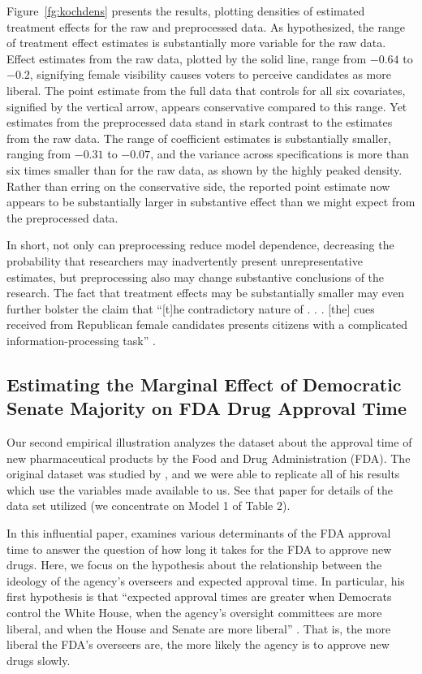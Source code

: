 \documentclass[11pt,titlepage]{article}
\begin{document}
Figure~\ref{fg:kochdens} presents the results, plotting densities of
estimated treatment effects for the raw and preprocessed data.  As
hypothesized, the range of treatment effect estimates is substantially
more variable for the raw data.  Effect estimates from the raw data,
plotted by the solid line, range from $-0.64$ to $-0.2$, signifying
female visibility causes voters to perceive candidates as more
liberal.  The point estimate from the full data that controls for all
six covariates, signified by the vertical arrow, appears conservative
compared to this range.  Yet estimates from the preprocessed data
stand in stark contrast to the estimates from the raw data.  The range
of coefficient estimates is substantially smaller, ranging from
$-0.31$ to $-0.07$, and the variance across specifications is more
than six times smaller than for the raw data, as shown by the highly
peaked density.  Rather than erring on the conservative side, the
reported point estimate now appears to be substantially larger in
substantive effect than we might expect from the preprocessed data.

In short, not only can preprocessing reduce model dependence,
decreasing the probability that researchers may inadvertently present
unrepresentative estimates, but preprocessing also may change
substantive conclusions of the research.  The fact that treatment
effects may be substantially smaller may even further bolster the
claim that ``[t]he contradictory nature of . . . [the] cues received
from Republican female candidates presents citizens with a complicated
information-processing task'' \citep[p. 460]{Koch02}.

\subsection{Estimating the Marginal Effect of Democratic Senate
  Majority on FDA Drug Approval Time} 

Our second empirical illustration analyzes the dataset about the
approval time of new pharmaceutical products by the Food and Drug
Administration (FDA). The original dataset was studied by
\citet{Carp02}, and we were able to replicate all of his results which
use the variables made available to us.  See that paper for details of the data
set utilized (we concentrate on Model 1 of Table 2).  

In this influential paper, \citet{Carp02} examines various
determinants of the FDA approval time to answer the question of how
long it takes for the FDA to approve new drugs. Here, we focus on the
hypothesis about the relationship between the ideology of the agency's
overseers and expected approval time. In particular, his first
hypothesis is that ``expected approval times are greater when
Democrats control the White House, when the agency's oversight
committees are more liberal, and when the House and Senate are more
liberal'' \citep[p.495]{Carp02}. That is, the more liberal the FDA's
overseers are, the more likely the agency is to approve new drugs
slowly. 
\end{document}
